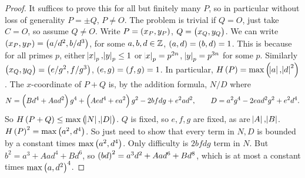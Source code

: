 \begin{proof}
It suffices to prove this for all but finitely many $ P $, so in particular without loss of generality $ P = \pm Q $, $ P \ne O $. The problem is trivial if $ Q = O $, just take $ C = O $, so assume $ Q \ne O $. Write $ P = \br{x_P, y_P} $, $ Q = \br{x_Q, y_Q} $. We can write $ \br{x_P, y_P} = \br{a / d^2, b / d^3} $, for some $ a, b, d \in \mathbb{Z} $, $ \br{a, d} = \br{b, d} = 1 $. This is because for all primes $ p $, either $ \abs{x}_p, \abs{y}_p \le 1 $ or $ \abs{x}_p = p^{2n} $, $ \abs{y}_p = p^{3n} $ for some $ p $. Similarly $ \br{x_Q, y_Q} = \br{e / g^2, f / g^3} $, $ \br{e, g} = \br{f, g} = 1 $. In particular, $ H\br{P} = \max\br{\abs{a}, \abs{d}^2} $. The $ x $-coordinate of $ P + Q $ is, by the addition formula, $ N / D $ where
$$ N = \br{Bd^4 + Aad^2}g^4 + \br{Aed^4 + ea^2}g^2 - 2bfdg + e^2ad^2, \qquad D = a^2g^4 - 2ead^2g^2 + e^2d^4. $$
So $ H\br{P + Q} \le \max\br{\abs{N}, \abs{D}} $. $ Q $ is fixed, so $ e, f, g $ are fixed, as are $ \abs{A}, \abs{B} $. $ H\br{P}^2 = \max\br{a^2, d^4} $. So just need to show that every term in $ N, D $ is bounded by a constant times $ \max\br{a^2, d^4} $. Only difficulty is $ 2bfdg $ term in $ N $. But $ b^2 = a^3 + Aad^4 + Bd^6 $, so $ \br{bd}^2 = a^3d^2 + Aad^6 + Bd^8 $, which is at most a constant times $ \max\br{a, d^2}^4 $.
\end{proof}

\pagebreak


